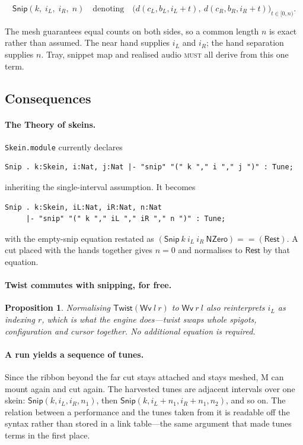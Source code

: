 \documentclass[11pt,a4paper]{article}
\newcommand{\MUST}{\textsc{must}}
\theoremstyle{definition}
\theoremstyle{plain}
\newtheorem{proposition}{Proposition}
\theoremstyle{remark}
\begin{document}
\[
\mathsf{Snip}(k,\; i_L,\; i_R,\; n)
\quad\text{denoting}\quad
\big(d(c_L,b_L,i_L+t),\ d(c_R,b_R,i_R+t)\big)_{t\in[0,n)} .
\]

The mesh guarantees equal counts on both sides, so a common length $n$ is exact rather than
assumed. The near hand supplies $i_L$ and $i_R$; the hand separation supplies $n$. Tray, snippet map
and realised audio \MUST{} all derive from this one term.

\subsection{Consequences}

\paragraph{The Theory of skeins.} \texttt{Skein.module} currently declares
\begin{lstlisting}
Snip . k:Skein, i:Nat, j:Nat |- "snip" "(" k "," i "," j ")" : Tune;
\end{lstlisting}
inheriting the single-interval assumption. It becomes
\begin{lstlisting}
Snip . k:Skein, iL:Nat, iR:Nat, n:Nat
     |- "snip" "(" k "," iL "," iR "," n ")" : Tune;
\end{lstlisting}
with the empty-snip equation restated as
$(\mathsf{Snip}\ k\ i_L\ i_R\ \mathsf{NZero}) == (\mathsf{Rest})$. A cut placed with the hands
together gives $n=0$ and normalises to $\mathsf{Rest}$ by that equation.

\paragraph{Twist commutes with snipping, for free.}
\begin{proposition}
Normalising $\mathsf{Twist}(\mathsf{Wv}\ l\ r)$ to $\mathsf{Wv}\ r\ l$ also reinterprets $i_L$ as
indexing $r$, which is what the engine does---twist swaps whole spigots, configuration and cursor
together. No additional equation is required.
\end{proposition}

\paragraph{A run yields a sequence of tunes.} Since the ribbon beyond the far cut stays attached and
stays meshed, M can mount again and cut again. The harvested tunes are adjacent intervals over one
skein: $\mathsf{Snip}(k,i_L,i_R,n_1)$, then $\mathsf{Snip}(k,i_L+n_1,i_R+n_1,n_2)$, and so on. The
relation between a performance and the tunes taken from it is readable off the syntax rather than
stored in a link table---the same argument that made tunes terms in the first place.
\end{document}
